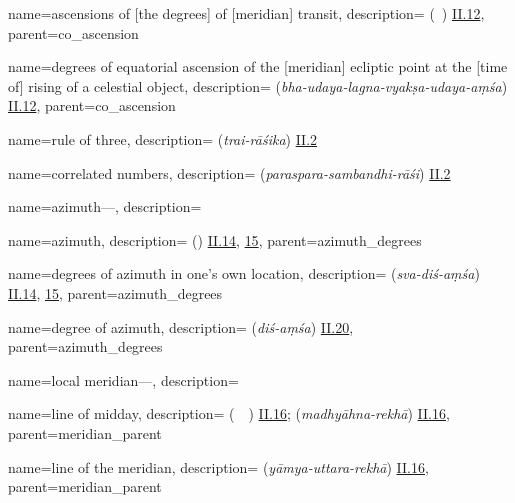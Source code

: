 {
        name={ascensions of [the degrees] of [meridian] transit},
        description={ (\matali\idafaconsonant\ \mamarr) \hyperlink{Pii12}{II.12}},
        parent={co_ascension}
}

{
        name={degrees of equatorial ascension of the [meridian] ecliptic point at the [time of] rising of a celestial object},
        description={ (\textit{bha-udaya-lagna-vyakṣa-udaya-aṃśa}) \hyperlink{Sii12}{II.12}},
        parent={co_ascension}
}


{
        name={rule of three},
        description={ (\textit{trai-rāśika}) \hyperlink{Sii2}{II.2}}
}

{
        name={correlated numbers},
        description={ (\textit{paraspara-sambandhi-rāśi}) \hyperlink{Sii2}{II.2}}
}

{
        name={azimuth---},
        description={\phantom{x}\nopagebreak}
}

{
        name={azimuth},
        description={ (\samt) \hyperlink{Pii14}{II.14}, \hyperlink{Pii15}{15}},
        parent={azimuth_degrees}
}

{
        name={degrees of azimuth in one's own location},
        description={ (\textit{sva-diś-aṃśa}) \hyperlink{Sii14}{II.14}, \hyperlink{Sii15}{15}},
        parent={azimuth_degrees}
}


{
        name={degree of azimuth},
        description={ (\textit{diś-aṃśa}) \hyperlink{Sii20}{II.20}},
        parent={azimuth_degrees}
}

{
        name={local meridian---},
        description={\phantom{x}\nopagebreak}
}

{
        name={line of midday},
        description={ (\khatt\ \nisf\ \alnahar) \hyperlink{Pii16}{II.16};  (\textit{madhyāhna-rekhā}) \hyperlink{Sii16}{II.16}},
        parent={meridian_parent}
}

{
        name={line of the meridian},
        description={ (\textit{yāmya-uttara-rekhā}) \hyperlink{Sii16}{II.16}},
        parent={meridian_parent}
}


